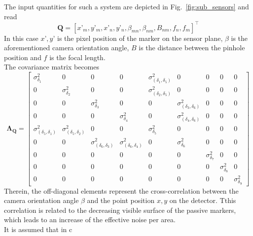 \documentclass[5p,times,procedia]{elsarticle}
\begin{document}
The input quantities for such a system are depicted in Fig.~\ref{fig:sub_sensors} and read
\begin{equation*}
	\mathbf{Q}= \left[x’_m, y’_m, x’_n, y’_n, \beta_{mn}, \beta_{nm}, B_{nm}, f_{n},f_{m}\right]^{\top}
\end{equation*}
In this case $x’, y’$ is the pixel position of the marker on the sensor plane, $\beta$ is the aforementioned camera orientation angle, $B$ is the distance between the pinhole position and $f$ is the focal length. \\
 
The covariance matrix becomes
\begin{equation}
	\label{eqn:CovarianceMatrix}
	\mathbf{\Lambda_{Q}} = 
	\begin{bmatrix}
		\sigma_{\delta_1}^2  & 0 & 0 & 0 & \sigma_{(\delta_1,\delta_5)}^2 & 0 & 0 & 0 & 0 \\
		0  & \sigma_{\delta_2}^2 & 0 & 0 & \sigma_{(\delta_2,\delta_5)}^2 & 0 & 0 & 0 & 0 \\
		0 & 0 & \sigma_{\delta_3}^2 & 0 & 0 & \sigma_{(\delta_3,\delta_6)}^2 & 0 & 0 & 0 \\
		0 & 0 & 0 & \sigma_{\delta_4}^2 & 0 & \sigma_{(\delta_4,\delta_6)}^2 & 0 & 0 & 0 \\
		\sigma_{(\delta_5,\delta_1)}^2 & \sigma_{(\delta_5,\delta_2)}^2 & 0 & 0 & \sigma_{\delta_5}^2 & 0 & 0 & 0 & 0 \\
		0 & 0 & \sigma_{(\delta_6,\delta_3)}^2 & \sigma_{(\delta_6,\delta_4)}^2 & 0 & \sigma_{\delta_6}^2 & 0 & 0 & 0 \\
		0 & 0 & 0 & 0 & 0 & 0 & \sigma_{\delta_7}^2 & 0 & 0 \\
		0 & 0 & 0 & 0 & 0 & 0 & 0 & \sigma_{\delta_8}^2 & 0 \\
		0 & 0 & 0 & 0 & 0 & 0 & 0 & 0 & \sigma_{\delta_9}^2
	\end{bmatrix}
\end{equation}
Therein, the off-diagonal elements represent the cross-correlation between the camera orientation angle $\beta$ and the point position $x,y$ on the detector.
Tthis correlation is related to the decreasing visible surface of the passive markers, which leads to an increase of the effective noise per area.\\

It is assumed that in c

\end{document}
